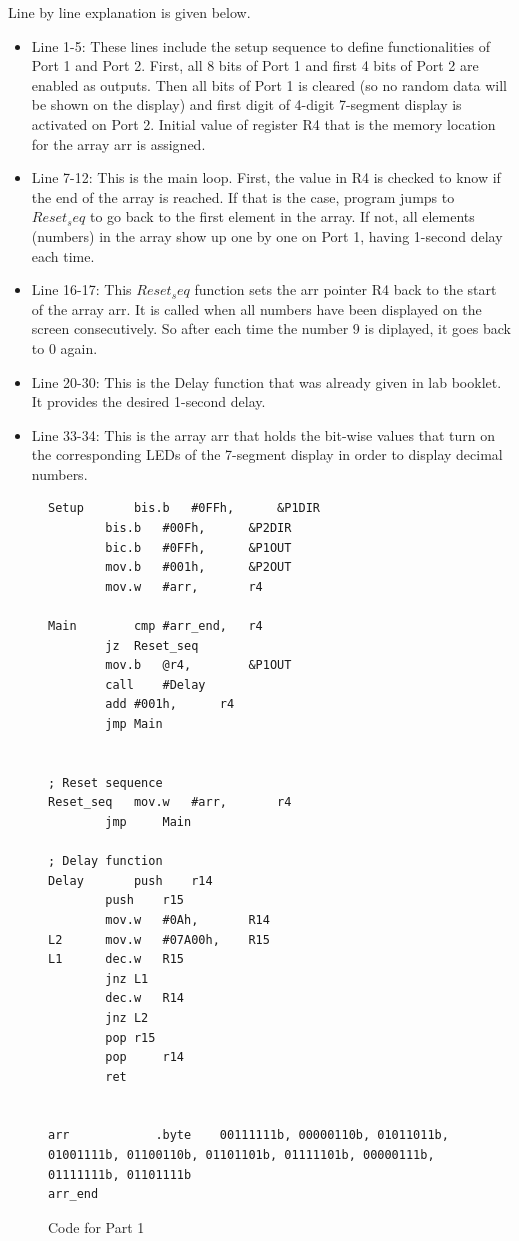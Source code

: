 \documentclass[pdftex,12pt,a4paper]{article}
\begin{document}
Line by line explanation is given below.
\begin{itemize}
    \item Line 1-5: These lines include the setup sequence to define functionalities of Port 1 and Port 2. First, all 8 bits of Port 1 and first 4 bits of Port 2 are enabled as outputs. Then all bits of Port 1 is cleared (so no random data will be shown on the display) and first digit of 4-digit 7-segment display is activated on Port 2. Initial value of register R4 that is the memory location for the array arr is assigned.

    \item Line 7-12: This is the main loop. First, the value in R4 is checked to know if the end of the array is reached. If that is the case, program jumps to $Reset_seq$ to go back to the first element in the array. If not, all elements (numbers) in the array show up one by one on Port 1, having 1-second delay each time.
    
    \item Line 16-17: This $Reset_seq$ function sets the arr pointer R4 back to the start of the array arr. It is called when all numbers have been displayed on the screen consecutively. So after each time the number 9 is diplayed, it goes back to 0 again.
    
    \item Line 20-30: This is the Delay function that was already given in lab booklet. It provides the desired 1-second delay.
    
    \item Line 33-34: This is the array arr that holds the bit-wise values that turn on the corresponding LEDs of the 7-segment display in order to display decimal numbers.
\end{itemize}

\begin{figure}[H]
    \centering
    \begin{lstlisting}[language={[x86masm]Assembler}]
Setup		bis.b	#0FFh,		&P1DIR
		bis.b	#00Fh,		&P2DIR
		bic.b	#0FFh,		&P1OUT
		mov.b	#001h,		&P2OUT
		mov.w	#arr, 		r4

Main		cmp	#arr_end, 	r4
		jz	Reset_seq
		mov.b	@r4,		&P1OUT
		call	#Delay
		add	#001h,		r4
		jmp	Main


; Reset sequence
Reset_seq	mov.w	#arr,		r4
		jmp     Main

; Delay function
Delay		push 	r14
		push    r15
		mov.w	#0Ah,		R14
L2		mov.w	#07A00h,	R15
L1		dec.w	R15
		jnz	L1
		dec.w	R14
		jnz	L2
		pop	r15
		pop 	r14
		ret


arr            .byte	00111111b, 00000110b, 01011011b, 01001111b, 01100110b, 01101101b, 01111101b, 00000111b, 01111111b, 01101111b
arr_end
    \end{lstlisting}
    \label{code:part1delay}
    \caption{Code for Part 1}
\end{figure}
\end{document}
